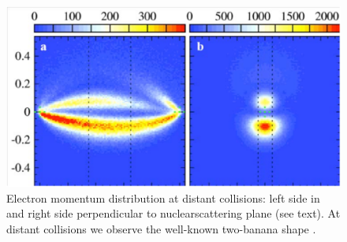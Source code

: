 \documentclass{article}
\begin{document}
\begin{figure}
\begin{center}
\includegraphics[scale=0.4]{figures/HeExp_results}
\caption{Electron momentum distribution at distant collisions: left side in and right side perpendicular to nuclearscattering plane (see text). At distant collisions we observe the well-known two-banana shape \citep{SchmidtLEtal2014Vortices}.}
\label{fig:HeExp_results}
\end{center}
\end{figure}
%
%
\end{document}
